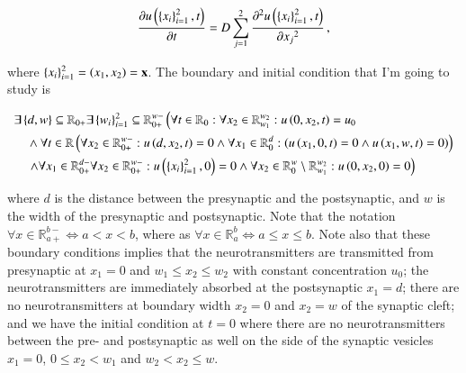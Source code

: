 \documentclass[11pt,english,a4paper]{article}
\begin{document}
\begin{flushleft}
\begin{align}
\frac{\partial u\left({\left\lbrace{x_i}\right\rbrace_{i=1}^2,t}\right)}{\partial t} = D\sum_{j=1}^2\frac{\partial^2 u\left({\left\lbrace{x_i}\right\rbrace_{i=1}^2,t}\right)}{\partial {x_j}^2}\,,
\label{eq_1}
\end{align}

where $\left\lbrace{x_i}\right\rbrace_{i=1}^2 = \left({x_1, x_2}\right) = \textbf{x}$. The boundary and initial condition that I'm going to study is 

\begin{align}
&\exists \left\lbrace{d, w}\right\rbrace \subseteq \mathbb{R}_{0+}\exists\left\lbrace{w_i}\right\rbrace_{i=1}^2 \subseteq \mathbb{R}_{0+}^{w-}\left(\forall t \in\mathbb{R}_{0}:\forall x_2 \in \mathbb{R}_{w_1}^{w_2} : u\left({0,x_2,t}\right) = u_0  \right.
\nonumber\\
& \quad \wedge \forall  t \in\mathbb{R} \left(\forall x_2\in\mathbb{R}_{0+}^{w-} : u\left({d, x_2, t}\right) = 0 
\wedge \forall x_1\in\mathbb{R}_{0}^d : \left(u\left({x_1,0, t}\right) = 0 \wedge u\left({x_1,w, t}\right) = 0\right) \right)
\nonumber\\
& \quad \left.\wedge
\forall x_1\in\mathbb{R}_{0+}^{d-}\forall x_2\in\mathbb{R}_{0+}^{w-} :u\left({\left\lbrace{x_i}\right\rbrace_{i=1}^2,0}\right)=0 \wedge \forall x_2 \in \mathbb{R}_0^w \setminus \mathbb{R}_{w_1}^{w_2} : u\left({0,x_2,0}\right) = 0 \right)
\label{eq_2}
\end{align}

where $d$ is the distance between the presynaptic and the postsynaptic, and $w$ is the width of the presynaptic and postsynaptic. Note that the notation $\forall x\in\mathbb{R}_{a+}^{b-} \Leftrightarrow a < x < b$, where as $\forall x\in\mathbb{R}_{a}^{b} \Leftrightarrow a \leq x \leq b$. Note also that these boundary conditions implies that the neurotransmitters are transmitted from presynaptic at $x_1=0$ and $w_1 \leq x_2\leq w_2$ with constant concentration $u_0$; the neurotransmitters are  immediately absorbed at the postsynaptic $x_1=d$; there are no neurotransmitters at boundary width $x_2=0$ and $x_2 = w$ of the synaptic cleft; and we have the initial condition at $t=0$ where there are no neurotransmitters between the pre- and postsynaptic as well on the side of the synaptic vesicles $x_1=0$, $0\leq x_2 < w_1$ and $w_2 < x_2 \leq w$. \linebreak



\end{flushleft}
\end{document}

